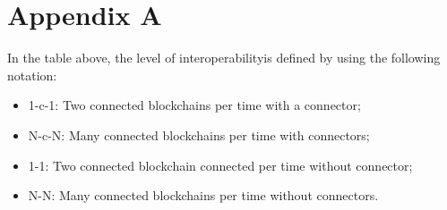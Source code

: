 

\chapter{Appendix A}
\label{app:A}

 

\noindent In the table above, the level of interoperability\footnotemark[1] is defined by using the following notation:
\begin{itemize}
    \item 1-c-1: Two connected blockchains per time with a connector;
    \item N-c-N: Many connected blockchains per time with connectors;
    \item 1-1: Two connected blockchain connected per time without connector;
    \item N-N: Many connected blockchains per time without connectors.
\end{itemize}







